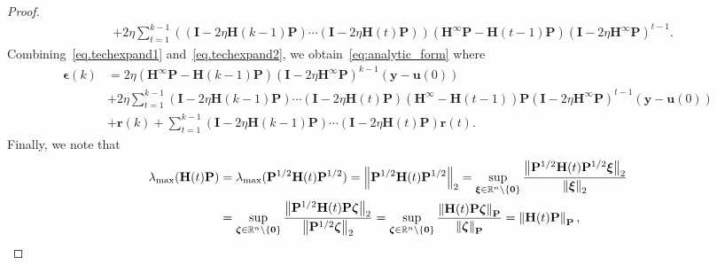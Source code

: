 \begin{proof}
\begin{equation}
\begin{aligned}
    & +\! 2\eta \sum_{t=1}^{k-1} \left((\mathbf{I} \!-\! 2\eta \mathbf{H}(k\!-\!1)\mathbf{P}) \!\cdots\! (\mathbf{I} \!-\! 2\eta \mathbf{H}(t)\mathbf{P})\right) (\mathbf{H}^\infty\mathbf{P} \!-\! \mathbf{H}(t\!-\!1)\mathbf{P}) (\mathbf{I} \!-\! 2\eta \mathbf{H}^\infty\mathbf{P})^{t-1}.
    \end{aligned}
\end{equation}
Combining~\cref{eq.techexpand1} and~\cref{eq.techexpand2}, we obtain~\cref{eq:analytic_form} where 
\begin{align*}
    \boldsymbol{\epsilon}(k) &= 2\eta (\mathbf{H}^\infty\mathbf{P} \!-\!\mathbf{H}(k\!-\!1)\mathbf{P}) (\mathbf{I} \!-\! 2\eta \mathbf{H}^\infty\mathbf{P})^{k-1}(\mathbf{y} \!-\! \mathbf{u}(0)) \\
    &+\!2\eta\! \sum_{t=1}^{k-1} (\mathbf{I} \!-\! 2\eta \mathbf{H}(k\!-\!1)\mathbf{P}) \!\cdots\! (\mathbf{I} \!-\! 2\eta \mathbf{H}(t)\mathbf{P}) (\mathbf{H}^\infty \!\!-\! \mathbf{H}(t\!-\!1))\mathbf{P} (\mathbf{I} \!-\! 2\eta \mathbf{H}^\infty\mathbf{P})^{t-1} (\mathbf{y} \!-\! \mathbf{u}(0)) \\
    &+\mathbf{r}(k) + \sum_{t=1}^{k-1} (\mathbf{I} \!-\! 2\eta \mathbf{H}(k\!-\!1)\mathbf{P}) \cdots (\mathbf{I} \!-\! 2\eta \mathbf{H}(t)\mathbf{P}) \mathbf{r}(t).
\end{align*}
Finally, we note that
\begin{equation}\label{eq.spectralradius}
    \begin{aligned}
    \lambda_{\max}(\mathbf{H}(t)\mathbf{P}) &= \lambda_{\max}(\mathbf{P}^{1/2}\mathbf{H}(t)\mathbf{P}^{1/2}) = \left\lVert\mathbf{P}^{1/2}\mathbf{H}(t)\mathbf{P}^{1/2}\right\rVert_2 = \sup_{\boldsymbol{\xi} \in \mathbb{R}^n \setminus \{\mathbf{0}\}} \frac{\left\lVert\mathbf{P}^{1/2}\mathbf{H}(t)\mathbf{P}^{1/2} \boldsymbol{\xi}\right\rVert_2}{\left\lVert\boldsymbol{\xi}\right\rVert_2} \\
    &= \sup_{\boldsymbol{\zeta} \in \mathbb{R}^n \setminus \{\mathbf{0}\}} \frac{\left\lVert\mathbf{P}^{1/2}\mathbf{H}(t)\mathbf{P} \boldsymbol{\zeta}\right\rVert_2}{\left\lVert\mathbf{P}^{1/2}\boldsymbol{\zeta}\right\rVert_2} = \sup_{\boldsymbol{\zeta} \in \mathbb{R}^n \setminus \{\mathbf{0}\}} \frac{\left\lVert\mathbf{H}(t)\mathbf{P} \boldsymbol{\zeta}\right\rVert_\mathbf{P}}{\left\lVert\boldsymbol{\zeta}\right\rVert_\mathbf{P}} = \left\lVert\mathbf{H}(t)\mathbf{P}\right\rVert_{\mathbf{P}},
    \end{aligned}
\end{equation}

\end{proof}
